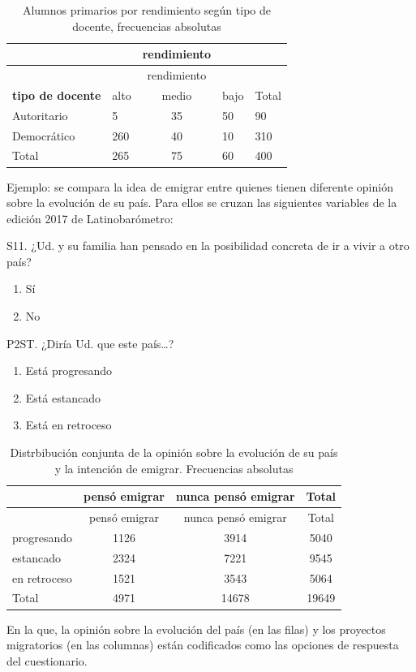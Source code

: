 \documentclass[]{book}
\providecommand{\tightlist}{%
  \setlength{\itemsep}{0pt}\setlength{\parskip}{0pt}}
\begin{document}
\begin{longtable}[]{@{}llcll@{}}
\caption{\label{tab:unnamed-chunk-113}Alumnos primarios por rendimiento según tipo de docente, frecuencias absolutas}\tabularnewline
\toprule
& & rendimiento & &\tabularnewline
\midrule
\endfirsthead
\toprule
& & rendimiento & &\tabularnewline
\midrule
\endhead
\textbf{tipo de docente} & alto & medio & bajo & Total\tabularnewline
Autoritario & 5 & 35 & 50 & 90\tabularnewline
Democrático & 260 & 40 & 10 & 310\tabularnewline
Total & 265 & 75 & 60 & 400\tabularnewline
\bottomrule
\end{longtable}

Ejemplo: se compara la idea de emigrar entre quienes tienen diferente opinión sobre la evolución de su país. Para ellos se cruzan las siguientes variables de la edición 2017 de Latinobarómetro:

S11. ¿Ud. y su familia han pensado en la posibilidad
concreta de ir a vivir a otro país?

\begin{enumerate}
\def\labelenumi{\arabic{enumi}.}
\tightlist
\item
  Sí
\item
  No
\end{enumerate}

P2ST. ¿Diría Ud. que este país\ldots{}?

\begin{enumerate}
\def\labelenumi{\arabic{enumi}.}
\tightlist
\item
  Está progresando
\item
  Está estancado
\item
  Está en retroceso
\end{enumerate}

\begin{longtable}[]{@{}lccc@{}}
\caption{\label{tab:abs}Distrbibución conjunta de la opinión sobre la evolución de su país y la intención de emigrar. Frecuencias absolutas}\tabularnewline
\toprule
& pensó emigrar & nunca pensó emigrar & Total\tabularnewline
\midrule
\endfirsthead
\toprule
& pensó emigrar & nunca pensó emigrar & Total\tabularnewline
\midrule
\endhead
progresando & 1126 & 3914 & 5040\tabularnewline
estancado & 2324 & 7221 & 9545\tabularnewline
en retroceso & 1521 & 3543 & 5064\tabularnewline
Total & 4971 & 14678 & 19649\tabularnewline
\bottomrule
\end{longtable}

En la que, la opinión sobre la evolución del país (en las filas) y los proyectos migratorios (en las columnas) están codificados como las opciones de respuesta del cuestionario.
\end{document}
